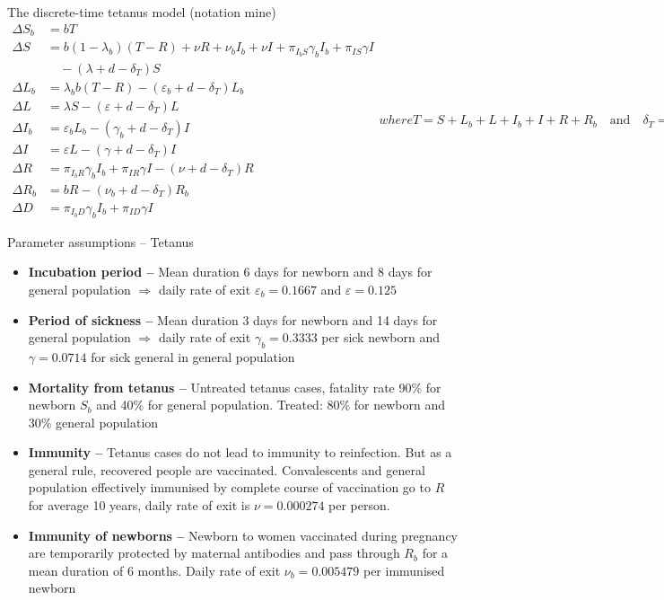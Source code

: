 \documentclass[aspectratio=169]{beamer}
\begin{document}
\begin{frame}{The discrete-time tetanus model (notation mine)}
  \begin{subequations}
    \begin{align}
      \Delta S_b &= bT \\
      \Delta S &= b(1-\lambda_b)(T-R)+\nu R+\nu_bI_b+\nu I+\pi_{I_bS}\gamma_bI_b+\pi_{IS}\gamma I \\ 
      &\quad -(\lambda+d-\delta_T)S \nonumber \\
      \Delta L_b &= \lambda_bb(T-R)-(\varepsilon_b+d-\delta_T)L_b \\
      \Delta L &= \lambda S-(\varepsilon+d-\delta_T)L \\
      \Delta I_b &= \varepsilon_bL_b-(\gamma_b+d-\delta_T)I \\
      \Delta I &= \varepsilon L-(\gamma+d-\delta_T)I \\
      \Delta R &= \pi_{I_bR}\gamma_bI_b+\pi_{IR}\gamma I-(\nu+d-\delta_T)R \\
      \Delta R_b &= bR-(\nu_b+d-\delta_T)R_b\\
      \Delta D &= \pi_{I_bD}\gamma_bI_b+\pi_{ID}\gamma I
    \end{align}
    where
    \begin{equation}
      T = S+L_b+L+I_b+I+R+R_b
      \quad\text{and}\quad
      \delta_T = \frac{\Delta D}{T}
    \end{equation}
  \end{subequations}
\end{frame}

\begin{frame}{Parameter assumptions -- Tetanus}
  \begin{itemize}
    \item \textbf{Incubation period --} Mean duration 6 days for newborn and 8 days for general population $\Rightarrow$ daily rate of exit $\varepsilon_b=0.1667$ and $\varepsilon=0.125$
    \item \textbf{Period of sickness --} Mean duration 3 days for newborn and 14 days for general population $\Rightarrow$ daily rate of exit $\gamma_b=0.3333$ per sick newborn and $\gamma=0.0714$ for sick general in general population
    \item \textbf{Mortality from tetanus --} Untreated tetanus cases, fatality rate 90\% for newborn $S_b$ and 40\% for general population. Treated: 80\% for newborn and 30\% general population
    \item \textbf{Immunity --} Tetanus cases do not lead to immunity to reinfection. But as a general rule, recovered people are vaccinated. Convalescents and general population effectively immunised by complete course of vaccination go to $R$ for average 10 years, daily rate of exit is $\nu=0.000274$ per person.
    \item \textbf{Immunity of newborns --} Newborn to women vaccinated during pregnancy are temporarily protected by maternal antibodies and pass through $R_b$ for a mean duration of 6 months. Daily rate of exit $\nu_b=0.005479$ per immunised newborn
  \end{itemize}
\end{frame}
\end{document}
